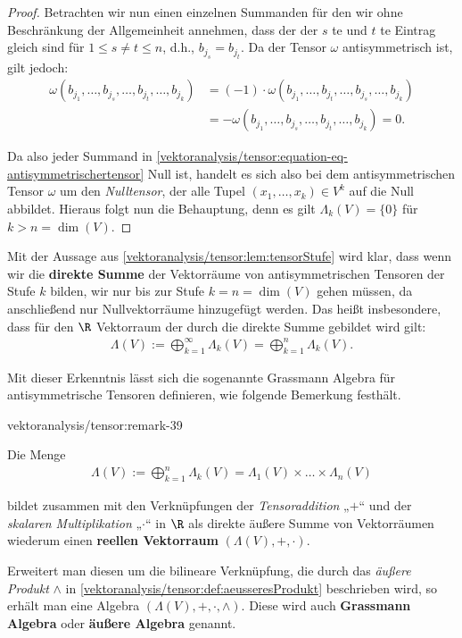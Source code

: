 \documentclass[letterpaper,10pt,german]{jupyterBook}
\begin{document}
\begin{proof}
\par
Betrachten wir nun einen einzelnen Summanden für den wir ohne Beschränkung der Allgemeinheit annehmen, dass der der \(s\) te und \(t\) te Eintrag gleich sind für \(1 \leq s \neq t \leq n\), d.h., \(b_{j_s}=b_{j_t}\).
Da der Tensor \(\omega\) antisymmetrisch ist, gilt jedoch:
\begin{align*}
\omega(b_{j_1}, \ldots, b_{j_s}, \ldots, b_{j_t}, \ldots, b_{j_k}) &= (-1) \cdot \omega(b_{j_1}, \ldots, b_{j_t}, \ldots, b_{j_s}, \ldots, b_{j_k}) \\
&= - \omega(b_{j_1}, \ldots, b_{j_s}, \ldots, b_{j_t}, \ldots, b_{j_k}) = 0.
\end{align*}
\par
Da also jeder Summand in \cref{vektoranalysis/tensor:equation-eq-antisymmetrischertensor} Null ist, handelt es sich also bei dem antisymmetrischen Tensor \(\omega\) um den \emph{Nulltensor}, der alle Tupel \((x_1, \ldots, x_k) \in V^k\) auf die Null abbildet.
Hieraus folgt nun die Behauptung, denn es gilt \(\Lambda_k(V) = \lbrace 0 \rbrace\) für \(k > n =\operatorname{dim}(V)\).
\end{proof}

\par
Mit der Aussage aus \cref{vektoranalysis/tensor:lem:tensorStufe} wird klar, dass wenn wir die \textbf{direkte Summe} der Vektorräume von antisymmetrischen Tensoren der Stufe \(k\) bilden, wir nur bis zur Stufe \(k = n = \operatorname{dim}(V)\) gehen müssen, da anschließend nur Nullvektorräume hinzugefügt werden.
Das heißt insbesondere, dass für den \(\R\) Vektorraum der durch die direkte Summe gebildet wird gilt:
\begin{align*}
\Lambda(V) := \bigoplus_{k=1}^\infty \Lambda_k(V) = \bigoplus_{k=1}^n \Lambda_k(V).
\end{align*}
\par
Mit dieser Erkenntnis lässt sich die sogenannte Grassmann Algebra für antisymmetrische Tensoren definieren, wie folgende Bemerkung festhält.
\begin{remark}{}{vektoranalysis/tensor:remark-39}



\par
Die Menge
\begin{align*}
\Lambda(V) := \bigoplus_{k=1}^n \Lambda_k(V) = \Lambda_1(V) \times \ldots \times \Lambda_n(V)
\end{align*}
\par
bildet zusammen mit den Verknüpfungen der \emph{Tensoraddition} „\(+\)“ und der \emph{skalaren Multiplikation} „\(\cdot\)“ in \(\R\) als direkte äußere Summe von Vektorräumen wiederum einen \textbf{reellen Vektorraum} \((\Lambda(V), +, \cdot)\).

\par
Erweitert man diesen um die bilineare Verknüpfung, die durch das \emph{äußere Produkt} \(\wedge\) in \cref{vektoranalysis/tensor:def:aeusseresProdukt} beschrieben wird, so erhält man eine Algebra \((\Lambda(V), +, \cdot, \wedge)\).
Diese wird auch \textbf{Grassmann Algebra} oder \textbf{äußere Algebra} genannt.
\end{remark}
\end{document}
